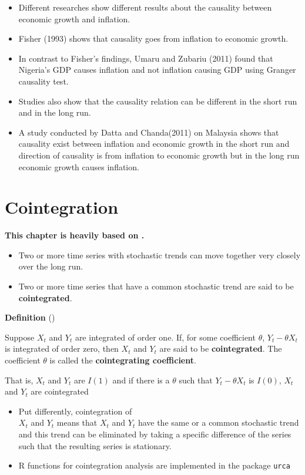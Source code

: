 \documentclass[]{book}
\providecommand{\tightlist}{%
  \setlength{\itemsep}{0pt}\setlength{\parskip}{0pt}}
\begin{document}
\begin{itemize}
\tightlist
\item
  Different researches show different results about the causality between economic growth and inflation.
\item
  Fisher (1993) shows that causality goes from inflation to economic growth.
\item
  In contrast to Fisher's findings, Umaru and Zubariu (2011) found that Nigeria's GDP causes inflation and not inflation causing GDP using Granger causality test.
\item
  Studies also show that the causality relation can be different in the short run and in the long run.
\item
  A study conducted by Datta and Chanda(2011) on Malaysia shows that causality exist between inflation and economic growth in the short run and direction of causality is from inflation to economic growth but in the long run economic growth causes inflation.
\end{itemize}

\newpage

\hypertarget{cointegration}{%
\section{Cointegration}\label{cointegration}}

\textbf{This chapter is heavily based on \citet{stock2015introduction}.}

\begin{itemize}
\tightlist
\item
  Two or more time series with stochastic trends can move together very closely over the long run.
\item
  Two or more time series that have a common stochastic trend are said to be \textbf{cointegrated}.
\end{itemize}

\textbf{Definition} (\citet{stock2015introduction})

Suppose \(X_t\) and \(Y_t\) are integrated of order one. If, for some coefficient \(\theta\), \(Y_t-\theta X_t\) is integrated of order zero, then \(X_t\) and \(Y_t\) are said to be \textbf{cointegrated}. The coefficient \(\theta\) is called the \textbf{cointegrating coefficient}.

That is, \(X_t\) and \(Y_t\) are \(I(1)\) and if there is a \(\theta\) such that \(Y_t-\theta X_t\) is \(I(0)\), \(X_t\) and \(Y_t\) are cointegrated

\begin{itemize}
\item
  Put differently, cointegration of\\
  \(X_t\) and \(Y_t\) means that \(X_t\) and \(Y_t\) have the same or a common stochastic trend and this trend can be eliminated by taking a specific difference of the series such that the resulting series is stationary.
\item
  R functions for cointegration analysis are implemented in the package \texttt{urca}
\end{itemize}
\end{document}
